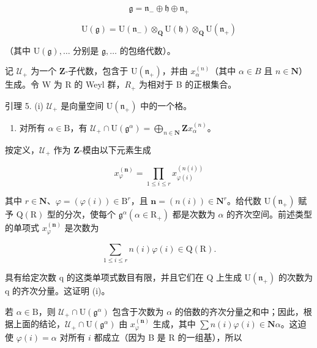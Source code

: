 \[
\mathfrak {g} = \mathfrak {n} _ {-} \oplus \mathfrak {h} \oplus \mathfrak {n} _ {+}\tag{21}
\]

\[
\mathrm{U} (\mathfrak {g}) = \mathrm{U} (\mathfrak {n} _ {-}) \otimes_ {\mathbf {Q}} \mathrm{U} (\mathfrak {h}) \otimes_ {\mathbf {Q}} \mathrm{U} (\mathfrak {n} _ {+})\tag{22}
\]

（其中 \(\mathrm{U}(\mathfrak{g}),\ldots\) 分别是 \(\mathfrak{g},\ldots\) 的包络代数）。

记 \(\mathcal{U}_{+}\) 为一个 \(\mathbf{Z}\)-子代数，包含于 \(\mathrm{U}(\mathfrak{n}_{+})\)，并由 \(x_{\alpha}^{(n)}\)（其中 \(\alpha \in B\) 且 \(n \in \mathbf{N}\)）生成。令 W 为 R 的 Weyl 群，\(R_{+}\) 为相对于 B 的正根集合。

引理 5. (i) \(\mathcal{U}_{+}\) 是向量空间 \(\mathrm{U}(\mathfrak{n}_{+})\) 中的一个格。

\begin{enumerate}
\def\labelenumi{(\roman{enumi})}
\setcounter{enumi}{1}
\tightlist
\item
  对所有 \(\alpha \in \mathrm{B}\)，有 \(\mathcal{U}_{+} \cap \mathrm{U}(\mathfrak{g}^{\alpha}) = \bigoplus_{n \in \mathbf{N}} \mathbf{Z}x_{\alpha}^{(n)}\)。
\end{enumerate}

按定义，\(\mathcal{U}_{+}\) 作为 \(\mathbf{Z}\)-模由以下元素生成

\[
x _ {\varphi} ^ {(\mathbf {n})} = \prod_ {1 \leq i \leq r} x _ {\varphi (i)} ^ {(n (i))}
\]

其中 \(r \in \mathbf{N}\)、\(\varphi = (\varphi(i)) \in \mathrm{B}^{r}\)，且 \(\mathbf{n} = (n(i)) \in \mathbf{N}^{r}\)。给代数 \(\mathrm{U}(\mathfrak{n}_{+})\) 赋予 \(\mathrm{Q}(\mathrm{R})\) 型的分次，使每个 \(\mathfrak{g}^{\alpha} (\alpha \in \mathrm{R}_{+})\) 都是次数为 \(\alpha\) 的齐次空间。前述类型的单项式 \(x_{\varphi}^{(\mathbf{n})}\) 是次数为

\[
\sum_ {1 \leq i \leq r} n (i) \varphi (i) \in \mathrm{Q} (\mathrm{R}).
\]

具有给定次数 q 的这类单项式数目有限，并且它们在 Q 上生成 \(\mathrm{U}(\mathfrak{n}_{+})\) 的次数为 q 的齐次分量。这证明 (i)。

若 \(\alpha \in \mathrm{B}\)，则 \(\mathcal{U}_{+} \cap \mathrm{U}(\mathfrak{g}^{\alpha})\) 包含于次数为 \(\alpha\) 的倍数的齐次分量之和中；因此，根据上面的结论，\(\mathcal{U}_{+} \cap \mathrm{U}(\mathfrak{g}^{\alpha})\) 由 \(x_{\varphi}^{(\mathbf{n})}\) 生成，其中 \(\sum n(i)\varphi(i) \in \mathbf{N}\alpha\)。这迫使 \(\varphi(i) = \alpha\) 对所有 \(i\) 都成立（因为 B 是 R 的一组基），所以

